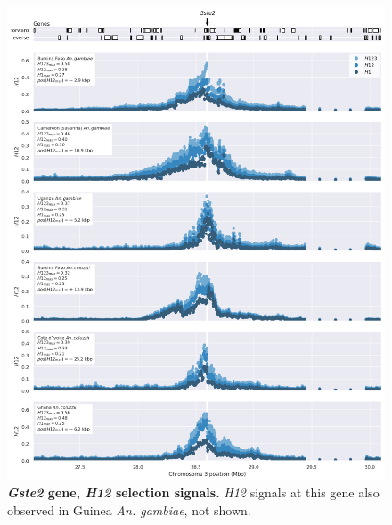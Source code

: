 \documentclass[a4paper,11pt,abstracton,hidelinks]{scrartcl}
\begin{document}
\begin{figure}[t!]
	\begin{center}
		\includegraphics*[width=1.1\linewidth,center]{artwork/locus_gste2_h12.png}
	\end{center}
	\caption[\textit{Gste2} gene, \textit{H12} selection signals]{
	\textbf{\textit{Gste2} gene, \textit{H12} selection signals.}
	\textit{H12} signals at this gene also observed in Guinea \textit{An. gambiae}, not shown. 
	} 
	\label{fig:locus_gste2_h12}
\end{figure}


\clearpage
\end{document}

